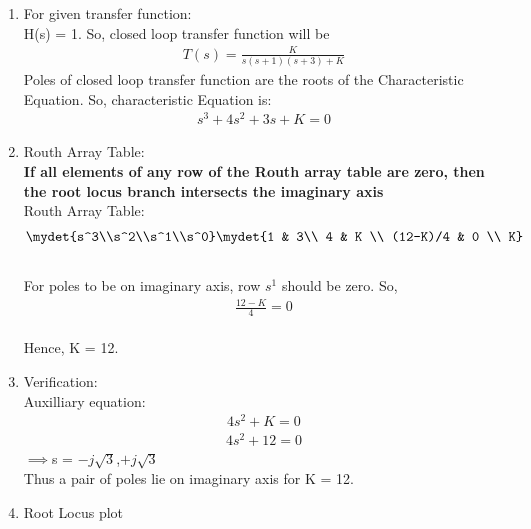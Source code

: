 \begin{enumerate}[label=\thesection.\arabic*.,ref=\thesection.\theenumi]
\item For given transfer function: \\
    H(s) = 1. So, closed loop transfer function will be
    \begin{align}
        T(s) = \frac{K}{s(s+1)(s+3)+K}
    \end{align}
    Poles of closed loop transfer function are the roots of the Characteristic Equation.
    So, characteristic Equation is:
    \begin{align}
        s^3 + 4s^2 + 3s + K = 0
    \end{align}

\item Routh Array Table:\\
    \textbf{If all elements of any row of the Routh array table are zero, then the root locus branch intersects the imaginary axis}\\
    Routh Array Table:
    \begin{align}
        \mydet{s^3\\s^2\\s^1\\s^0}
        \mydet{1 & 3\\ 4 & K \\ (12-K)/4 & 0 \\ K}
    \end{align}\\
    For poles to be on imaginary axis, row $s^1$ should be zero. So,     
    \begin{align}
        \frac{12-K}{4} = 0
    \end{align}\\
    Hence, K = 12.

\item Verification: \\
    Auxilliary equation:
    \begin{align}
        4s^2 + K = 0
    \end{align}
    \begin{align}
        4s^2 + 12 = 0
    \end{align}
    $\implies$s = $-j\sqrt{3}$,$+j\sqrt{3}$\\ 
    Thus a pair of poles lie on imaginary axis for K = 12.
   

\item Root Locus plot


\end{enumerate}
